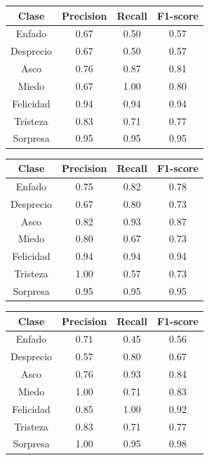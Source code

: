 \begin{table}[h!]
\begin{minipage}{0.48\linewidth}
\centering
\begin{adjustbox}{max width=\textwidth}
\begin{tabular}{|c|c|c|c|}
\hline
\textbf{Clase} & \textbf{Precision} & \textbf{Recall} & \textbf{F1-score}\\
\hline
     Enfado & 0.67 & 0.50 & 0.57\\
     Desprecio & 0.67 & 0.50 & 0.57\\
     Asco & 0.76 & 0.87 & 0.81\\
     Miedo & 0.67 & 1.00 & 0.80\\
     Felicidad & 0.94 & 0.94 & 0.94\\
     Tristeza & 0.83 & 0.71 & 0.77\\
     Sorpresa & 0.95 & 0.95 & 0.95\\
\hline
\end{tabular}
\end{adjustbox}
\vspace{0.5cm}

\begin{adjustbox}{max width=\textwidth}
\begin{tabular}{|c|c|c|c|}
\hline
\textbf{Clase} & \textbf{Precision} & \textbf{Recall} & \textbf{F1-score}\\
\hline
     Enfado & 0.75 & 0.82 & 0.78\\
     Desprecio & 0.67 & 0.80 & 0.73\\
     Asco & 0.82 & 0.93 & 0.87\\
     Miedo & 0.80 & 0.67 & 0.73\\
     Felicidad & 0.94 & 0.94 & 0.94\\
     Tristeza & 1.00 & 0.57 & 0.73\\
     Sorpresa & 0.95 & 0.95 & 0.95\\
\hline
\end{tabular}
\end{adjustbox}
\end{minipage}\hfill
\begin{minipage}{0.48\linewidth}
\centering
\begin{adjustbox}{max width=\textwidth}
\begin{tabular}{|c|c|c|c|}
\hline
\textbf{Clase} & \textbf{Precision} & \textbf{Recall} & \textbf{F1-score}\\
\hline
     Enfado & 0.71 & 0.45 & 0.56\\
     Desprecio & 0.57 & 0.80 & 0.67\\
     Asco & 0.76 & 0.93 & 0.84\\
     Miedo & 1.00 & 0.71 & 0.83\\
     Felicidad & 0.85 & 1.00 & 0.92\\
     Tristeza & 0.83 & 0.71 & 0.77\\
     Sorpresa & 1.00 & 0.95 & 0.98\\
\hline
\end{tabular}
\end{adjustbox}
\vspace{0.5cm}


\end{minipage}
\end{table}
